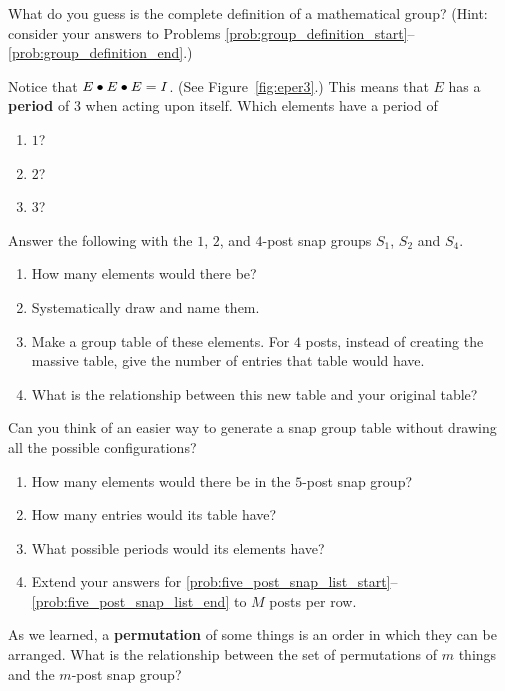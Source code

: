 \documentclass[../gatm_answers.tex]{subfiles}
\begin{document}
\begin{outer_problem}
	\item What do you guess is the complete definition of a mathematical group?
	      (Hint: consider your answers to Problems \ref{prob:group_definition_start}--\ref{prob:group_definition_end}.)
	\item Notice that $E\bullet E\bullet E=I$. (See Figure~\ref{fig:eper3}.)
	      This means that $E$ has a \textbf{period} of $3$ when acting upon itself.
	      Which elements have a period of
	      \begin{multicols}{3}
		      \begin{enumerate}
			      \item $1$?
			      \item $2$?
			      \item $3$?
		      \end{enumerate}
	      \end{multicols}
	\item Answer the following with the $1$, $2$, and $4$-post snap groups $S_1$, $S_2$ and $S_4$.\begin{enumerate}
		      \item How many elements would there be?
		      \item Systematically draw and name them.
		      \item Make a group table of these elements.
		            For $4$ posts, instead of creating the massive table, give the number of entries that table would have.
		      \item What is the relationship between this new table and your original table?
	      \end{enumerate}
	\item Can you think of an easier way to generate a snap group table without drawing all the possible configurations?
	\item \begin{enumerate}
		      \item How many elements would there be in the $5$-post snap group? \label{prob:five_post_snap_list_start}
		      \item How many entries would its table have?
		      \item What possible periods would its elements have? \label{prob:five_post_snap_list_end}
		      \item Extend your answers for \ref{prob:five_post_snap_list_start}--\ref{prob:five_post_snap_list_end} to $M$ posts per row.
	      \end{enumerate}
	\item As we learned, a \textbf{permutation} of some things is an order in which they can be arranged.
	      What is the relationship between the set of permutations of $m$ things and the $m$-post snap group?
\end{outer_problem}
\end{document}
